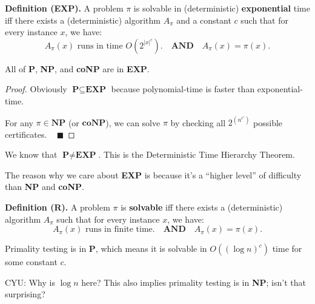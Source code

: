 \textbf{Definition (EXP).} A problem $\pi$ is solvable in (deterministic) \textbf{exponential} time iff there exists a (deterministic) algorithm $A_{\pi}$ and a constant $c$ such that for every instance $x$, we have:
\[ A_{\pi}(x) \text{ runs in time } O(2^{|x|^c}). ~~~ \textbf{ AND } ~~~ A_{\pi}(x) = \pi(x). \]

\begin{claim}
    All of \textbf{P}, \textbf{NP}, and \textbf{coNP} are in \textbf{EXP}.
\end{claim}

\begin{proof}
    Obviously $\textbf{P} \subseteq \textbf{EXP}$ because polynomial-time is faster than exponential-time.

    For any $\pi \in \textbf{NP}$ (or $\textbf{coNP}$), we can solve $\pi$ by checking all $2^{\left(n^{c'}\right)}$ possible certificates. ~ $\blacksquare$
\end{proof}

\begin{remark}
    We know that $\textbf{P} \neq \textbf{EXP}$.  This is the Deterministic Time Hierarchy Theorem.

    The reason why we care about \textbf{EXP} is because it's a ``higher level'' of difficulty than \textbf{NP} and \textbf{coNP}.
\end{remark}


\textbf{Definition (R).} A problem $\pi$ is \textbf{solvable} iff there exists a (deterministic) algorithm $A_{\pi}$ such that for every instance $x$, we have:
\[ A_{\pi}(x) \text{ runs in finite time.} ~~~ \textbf{ AND } ~~~ A_{\pi}(x) = \pi(x). \]

\begin{remark}
    Primality testing is in \textbf{P}, which means it is solvable in $O((\log n)^c)$ time for some constant $c$.
    
    CYU: Why is $\log n$ here?  This also implies primality testing is in \textbf{NP}; isn't that surprising?
\end{remark}


